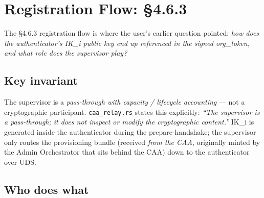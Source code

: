 \documentclass[11pt, a4paper]{article}
\newcommand{\code}[1]{\texttt{\small #1}}
\begin{document}
\clearpage

\section{Registration Flow: \S4.6.3}\label{sec:registration}

The §4.6.3 registration flow is where the user's earlier question pointed:
\emph{how does the authenticator's IK\_i public key end up referenced in
the signed org\_token, and what role does the supervisor play?}

\subsection{Key invariant}

\begin{infobox}
The supervisor is a \emph{pass-through with capacity / lifecycle
accounting} --- not a cryptographic participant. \code{caa\_relay.rs}
states this explicitly: \emph{``The supervisor is a pass-through; it
does not inspect or modify the cryptographic content.''} IK\_i is
generated inside the authenticator during the prepare-handshake; the
supervisor only routes the provisioning bundle (received \emph{from
the CAA}, originally minted by the Admin Orchestrator that sits behind
the CAA) down to the authenticator over UDS.
\end{infobox}

\subsection{Who does what}
\end{document}
